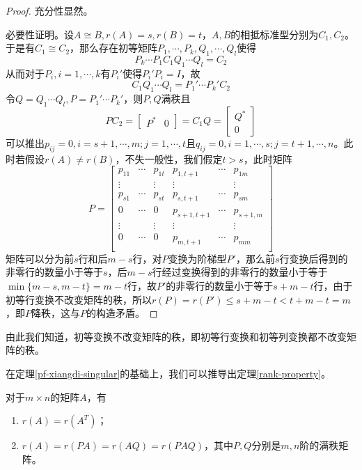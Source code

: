 \begin{proof}
    \label{pf-xiangdi-singular}
    充分性显然。

    必要性证明。设$A\cong B,r(A)=s,r(B)=t$，$A,B$的相抵标准型分别为$C_1,C_2$。于是有$C_1\cong C_2$，那么存在初等矩阵$P_1,\cdots,P_k,Q_1,\cdots,Q_l$使得
    $$
    P_k\cdots P_1C_1Q_1\cdots Q_l=C_2
    $$
    从而对于$P_i,i=1,\cdots,k$有$P_i'$使得$P_i' P_i=I$，故
    $$
    C_1Q_1\cdots Q_l=P_1'\cdots P_k'C_2
    $$
    令$Q=Q_1\cdots Q_l,P=P_1'\cdots P_k'$，则$P,Q$满秩且
    $$
    PC_2=\begin{bmatrix}
        P^* & 0
    \end{bmatrix}=C_1Q=\begin{bmatrix}
        Q^* \\ 0
    \end{bmatrix}
    $$
    可以推出$p_{ij}=0,i=s+1,\cdots,m;j=1,\cdots,t$且$q_{ij}=0,i=1,\cdots,s;j=t+1,\cdots,n$。此时若假设$r(A)\neq r(B)$，不失一般性，我们假定$t>s$，此时矩阵
    $$
    P=\begin{bmatrix}
        p_{11} & \cdots & p_{1t} & p_{1,t+1} & \cdots & p_{1m} \\
        \vdots & & \vdots & \vdots & & \vdots \\
        p_{s1} & \cdots & p_{st} & p_{s,t+1} & \cdots & p_{sm} \\
        0 & \cdots & 0 & p_{s+1,t+1} & \cdots & p_{s+1,m} \\
        \vdots & & \vdots & \vdots & & \vdots \\
        0 & \cdots & 0 & p_{m,t+1} & \cdots & p_{mm} \\
    \end{bmatrix}
    $$
    矩阵可以分为前$s$行和后$m-s$行，对$P$变换为阶梯型$P'$，那么前$s$行变换后得到的非零行的数量小于等于$s$，后$m-s$行经过变换得到的非零行的数量小于等于$\min\{m-s,m-t\}=m-t$行，故$P'$的非零行的数量小于等于$s+m-t$行，由于初等行变换不改变矩阵的秩，所以$r(P)=r(P')\leqslant s+m-t<t+m-t=m$，即$P$降秩，这与$P$的构造矛盾。
\end{proof}

\begin{remark}
    由此我们知道，初等变换不改变矩阵的秩，即初等行变换和初等列变换都不改变矩阵的秩。
\end{remark}

在定理\ref{pf-xiangdi-singular}的基础上，我们可以推导出定理\ref{rank-property}。

\begin{thm}
    \label{rank-property}
    对于$m\times n$的矩阵$A$，有
    \begin{enumerate}
        \item $r(A)=r(A^T)$；
        \item $r(A)=r(PA)=r(AQ)=r(PAQ)$，其中$P,Q$分别是$m,n$阶的满秩矩阵。
    \end{enumerate}
\end{thm}
